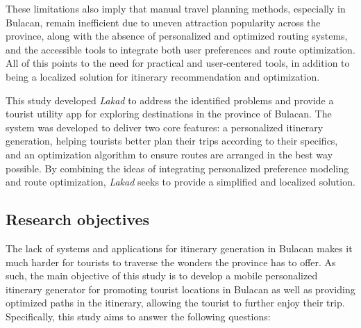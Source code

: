 These limitations also imply that manual travel planning methods, especially in Bulacan, remain inefficient due to uneven attraction popularity across the province, along with the absence of personalized and optimized routing systems, and the accessible tools to integrate both user preferences and route optimization. All of this points to the need for practical and user-centered tools, in addition to being a localized solution for itinerary recommendation and optimization.

This study developed \textit{Lakad} to address the identified problems and provide a tourist utility app for exploring destinations in the province of Bulacan. The system was developed to deliver two core features: a personalized itinerary generation, helping tourists better plan their trips according to their specifics, and an optimization algorithm to ensure routes are arranged in the best way possible. By combining the ideas of integrating personalized preference modeling and route optimization, \textit{Lakad} seeks to provide a simplified and localized solution.

\subsection{Research objectives}
The lack of systems and applications for itinerary generation in Bulacan makes it much harder for tourists to traverse the wonders the province has to offer. As such, the main objective of this study is to develop a mobile personalized itinerary generator for promoting tourist locations in Bulacan as well as providing optimized paths in the itinerary, allowing the tourist to further enjoy their trip. Specifically, this study aims to answer the following questions:

